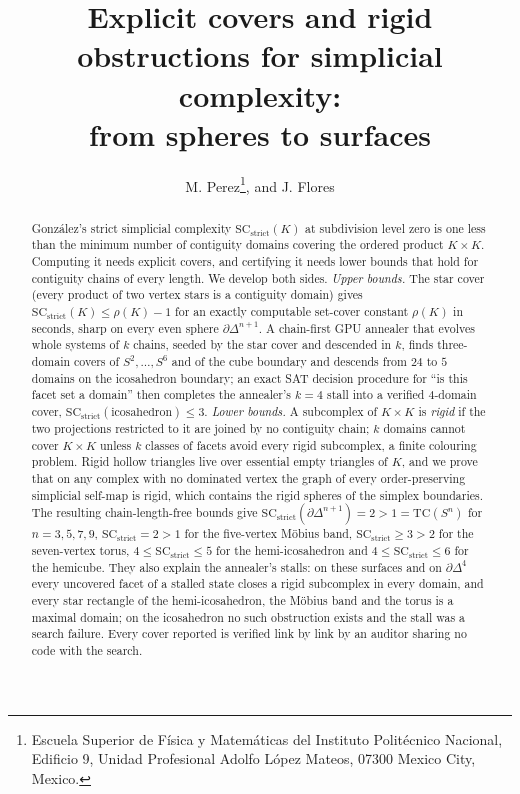 \documentclass[12pt]{article}
\title{Explicit covers and rigid obstructions for simplicial complexity:\\
 from spheres to surfaces}
\author{M. Perez\footnote{Escuela Superior de F\'isica
y Matem\'aticas del Instituto Polit\'ecnico Nacional, Edificio 9, Unidad
Profesional Adolfo L\'opez Mateos, 07300 Mexico City, Mexico.}, and
J. Flores\footnotemark[1]}
\date{}
\newcommand{\TC}{\mathrm{TC}}
\newcommand{\SC}{\mathrm{SC}}
\newcommand{\SCst}{\SC_{\mathrm{strict}}}
\begin{document}
\maketitle

\begin{abstract}
Gonz\'alez's strict simplicial complexity $\SCst(K)$ at subdivision level
zero is one less than the minimum number of contiguity domains covering the
ordered product $K\times K$.  Computing it needs explicit covers, and
certifying it needs lower bounds that hold for contiguity chains of every
length.  We develop both sides.  \emph{Upper bounds.}  The star cover
(every product of two vertex stars is a contiguity domain) gives
$\SCst(K)\le\rho(K)-1$ for an exactly computable set-cover constant $\rho(K)$
in seconds, sharp on every even sphere $\partial\Delta^{n+1}$.  A
chain-first GPU annealer that evolves whole systems of $k$ chains, seeded by
the star cover and descended in $k$, finds three-domain covers of
$S^2,\dots,S^6$ and of the cube boundary and descends from $24$ to $5$
domains on the icosahedron boundary; an exact SAT decision procedure for
``is this facet set a domain'' then completes the annealer's $k=4$ stall
into a verified $4$-domain cover, $\SCst(\text{icosahedron})\le3$.
\emph{Lower bounds.}  A subcomplex of $K\times K$ is \emph{rigid} if the two
projections restricted to it are joined by no contiguity chain; $k$ domains
cannot cover $K\times K$ unless $k$ classes of facets avoid every rigid
subcomplex, a finite colouring problem.  Rigid hollow triangles live over
essential empty triangles of $K$, and we prove that on any complex with no
dominated vertex the graph of every order-preserving simplicial self-map is
rigid, which contains the rigid spheres of the simplex boundaries.  The
resulting chain-length-free bounds give $\SCst(\partial\Delta^{n+1})=2>1=\TC(S^n)$
for $n=3,5,7,9$, $\SCst=2>1$ for the five-vertex M\"obius band, $\SCst\ge3>2$
for the seven-vertex torus, $4\le\SCst\le5$ for the hemi-icosahedron and
$4\le\SCst\le6$ for the hemicube.  They also explain the annealer's stalls:
on these surfaces and on $\partial\Delta^4$ every uncovered facet of a
stalled state closes a rigid subcomplex in every domain, and every star
rectangle of the hemi-icosahedron, the M\"obius band and the torus is a
maximal domain; on the icosahedron no such obstruction exists and the stall
was a search failure.  Every cover reported is verified link by link by an
auditor sharing no code with the search.
\end{abstract}
\end{document}
